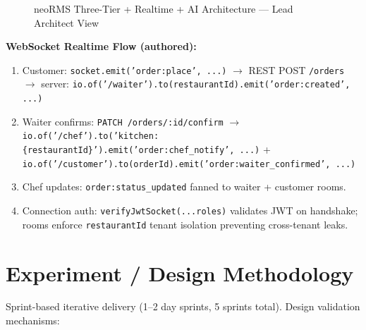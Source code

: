 \begin{figure}[H]
\centering
{}
\caption{neoRMS Three-Tier + Realtime + AI Architecture --- Lead Architect View}
\label{fig:architecture}
\end{figure}

\textbf{WebSocket Realtime Flow (authored):}
\begin{enumerate}
\item Customer: \texttt{socket.emit('order:place', ...)} $\rightarrow$ REST POST \texttt{/orders} $\rightarrow$ server: \texttt{io.of('/waiter').to(restaurantId).emit('order:created', ...)}
\item Waiter confirms: \texttt{PATCH /orders/:id/confirm} $\rightarrow$ \texttt{io.of('/chef').to('kitchen:\{restaurantId\}').emit('order:chef\_notify', ...)} + \texttt{io.of('/customer').to(orderId).emit('order:waiter\_confirmed', ...)}
\item Chef updates: \texttt{order:status\_updated} fanned to waiter + customer rooms.
\item Connection auth: \texttt{verifyJwtSocket(...roles)} validates JWT on handshake; rooms enforce \texttt{restaurantId} tenant isolation preventing cross-tenant leaks.
\end{enumerate}

\section{Experiment / Design Methodology}
\label{sec:design_methodology}

Sprint-based iterative delivery (1--2 day sprints, 5 sprints total). Design validation mechanisms:

